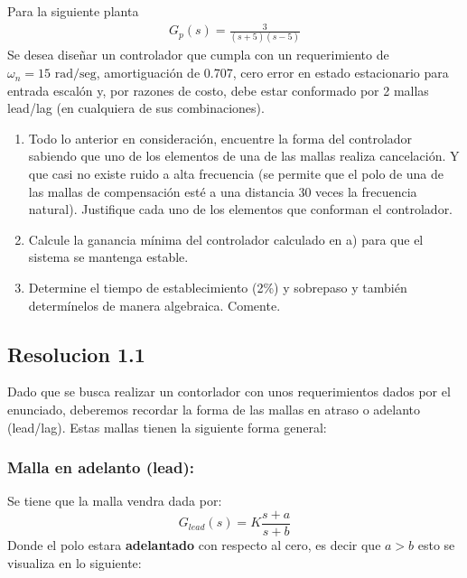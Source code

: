 \documentclass[
  11pt,
  letterpaper,
   addpoints,
   answers
  ]{exam}
\begin{document}
\begin{questions}
    \question Para la siguiente planta
    \begin{align}
        G_p(s)=\frac{3}{(s+5)(s-5)}
    \end{align}
    Se desea diseñar un controlador que cumpla con un requerimiento de $\omega_n = 15 \text{ rad/seg}$, amortiguación de 0.707, cero error en estado estacionario para entrada escalón y, por razones de costo, debe estar conformado por 2 mallas lead/lag (en cualquiera de sus combinaciones).
    \begin{enumerate}
        \item Todo lo anterior en consideración, encuentre la forma del controlador sabiendo que uno de los elementos de una de las mallas realiza cancelación. Y que casi no existe ruido a alta frecuencia (se permite que el polo de una de las mallas de compensación esté a una distancia 30 veces la frecuencia natural). Justifique cada uno de los elementos que conforman el controlador.
        \item  Calcule la ganancia mínima del controlador calculado en a) para que el sistema se mantenga estable.
        \item Determine el tiempo de establecimiento (2\%) y sobrepaso y también determínelos de manera algebraica. Comente.
    \end{enumerate}
\begin{solution}
\subsection*{Resolucion 1.1}
Dado que se busca realizar un contorlador con unos requerimientos dados por el enunciado, deberemos recordar la forma de las mallas en atraso o adelanto (lead/lag). Estas mallas tienen la siguiente forma general:
\subsubsection*{Malla en adelanto (lead):}
Se tiene que la malla vendra dada por:
\begin{equation}
    G_{lead}(s)=K\frac{s+a}{s+b}
\end{equation}
Donde el polo estara \textbf{adelantado} con respecto al cero, es decir que $a>b$ esto se visualiza en lo siguiente:
\begin{center}
\end{center}
\end{solution}
\end{questions}
\end{document}
